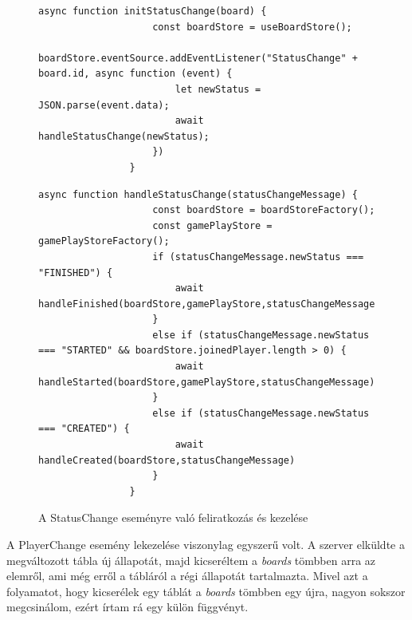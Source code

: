 \documentclass[a4paper,twoside]{article}
\begin{document}
\begin{figure}
	\caption{A StatusChange eseményre való feliratkozás és kezelése}
		\begin{minipage}{\textwidth}
			\begin{lstlisting}[style=javascriptStyle]
				async function initStatusChange(board) {
					const boardStore = useBoardStore();
					boardStore.eventSource.addEventListener("StatusChange" + board.id, async function (event) {
						let newStatus = JSON.parse(event.data);
						await handleStatusChange(newStatus);
					})
				}
			\end{lstlisting}
		\end{minipage}
		\begin{minipage}{\textwidth}
			\begin{lstlisting}[style=javascriptStyle]
				async function handleStatusChange(statusChangeMessage) {
					const boardStore = boardStoreFactory();
					const gamePlayStore = gamePlayStoreFactory();
					if (statusChangeMessage.newStatus === "FINISHED") {
						await handleFinished(boardStore,gamePlayStore,statusChangeMessage);
					}
					else if (statusChangeMessage.newStatus === "STARTED" && boardStore.joinedPlayer.length > 0) {
						await handleStarted(boardStore,gamePlayStore,statusChangeMessage)
					}
					else if (statusChangeMessage.newStatus === "CREATED") {
						await handleCreated(boardStore,statusChangeMessage)
					}
				}
			\end{lstlisting}
		\end{minipage}
	\label{statuschange}
\end{figure}
\FloatBarrier
A PlayerChange esemény lekezelése viszonylag egyszerű volt. A szerver elküldte a megváltozott tábla új állapotát, majd kicseréltem a \textit{boards} tömbben arra az elemről, ami még erről a tábláról a régi állapotát tartalmazta. Mivel azt a folyamatot, hogy kicserélek egy táblát a \textit{boards} tömbben egy újra, nagyon sokszor megcsinálom, ezért írtam rá egy külön függvényt. 
\end{document}
